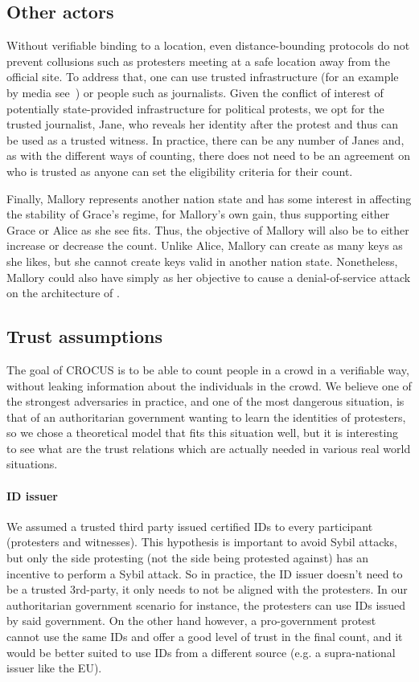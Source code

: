 \subsection{Other actors}

Without verifiable binding to a location, even distance-bounding protocols do not prevent collusions such as protesters meeting at a safe location away from the official site. 
To address that, one can use trusted infrastructure (for an example by media see~\cite{LeMondeProtestingSolution}) or people such as journalists. 
Given the conflict of interest of potentially state-provided infrastructure for political protests, we opt for the trusted journalist, Jane, who reveals her identity after the protest and thus can be used as a trusted witness. 
In practice, there can be any number of  Janes and, as with the different ways of counting, there does not need to be an agreement on who is trusted as anyone can set the eligibility criteria for their count.

Finally, Mallory represents another nation state and has some interest in affecting the stability of Grace's regime, for Mallory's own gain, thus supporting either Grace or Alice as she see fits.  
Thus, the objective of Mallory will also be to either increase or decrease the count. 
Unlike Alice, Mallory can create as many keys as she likes, but she cannot create keys valid in another nation state. 
Nonetheless, Mallory could also have simply as her objective to cause a denial-of-service attack on the architecture of \CROCUS.


\subsection{Trust assumptions}

The goal of CROCUS is to be able to count people in a crowd in a verifiable way, without leaking information about the individuals in the crowd.
We believe one of the strongest adversaries in practice, and one of the most dangerous situation, is that of an authoritarian government wanting to learn the identities of protesters,
so we chose a theoretical model that fits this situation well, but it is interesting to see what are the trust relations which are actually needed in various real world situations.

\paragraph{ID issuer} We assumed a trusted third party issued certified IDs to every participant (protesters and witnesses). This hypothesis is important to avoid Sybil attacks,
but only the side protesting (not the side being protested against) has an incentive to perform a Sybil attack.
So in practice, the ID issuer doesn't need to be a trusted 3rd-party, it only needs to not be aligned with the protesters.
In our authoritarian government scenario for instance, the protesters can use IDs issued by said government.
On the other hand however, a pro-government protest cannot use the same IDs and offer a good level of trust in the final count, and it would be better suited to use IDs from a different source
(e.g. a supra-national issuer like the EU).

